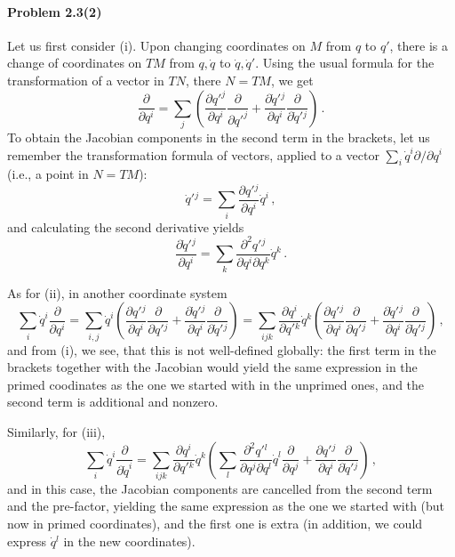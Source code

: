 \documentclass[a4paper,12pt]{article}
\newcommand{\problem}[1]{\paragraph{Problem #1}}
\begin{document}
\problem{2.3(2)} Let us first consider (i). Upon changing coordinates on $M$ from $q$ to $q'$, there is a change of coordinates on $TM$ from $q, \dot{q}$ to $\dot{q}, {\dot q}'$. Using the usual formula for the transformation of a vector in $TN$, there $N=TM$, we get
\[
\frac{\partial}{\partial q^i} = \sum_j \left( \frac{\partial {q'}^j}{\partial q^i}\frac{\partial}{\partial {q'}^j} + \frac{\partial \dot{q}{}'{}^j}{\partial q^i}\frac{\partial}{\partial \dot{q}{}'{}^j}\right)\,.
\]
To obtain the Jacobian components in the second term in the brackets, let us remember the transformation formula of vectors, applied to a vector $\sum_i {\dot q}^i \partial/\partial q^i$ (i.e., a point in $N=TM$):
\[
\dot{q}{}'{}^j = \sum_i \frac{\partial q'{}^j}{\partial q^i} \dot{q}{}^i\,,
\]
and calculating the second derivative yields
\[
\frac{\partial \dot{q}{}'{}^j}{\partial q^i} = \sum_k\frac{\partial^2 q'{}^j}{\partial q^i \partial q^k}\dot{q}{}^k\,.
\]

As for (ii), in another coordinate system
\[
\sum_i {\dot q}^i \frac{\partial}{\partial q^i} = \sum_{i,j} {\dot q}^i \left( \frac{\partial q'{}^j}{\partial q^i} \frac{\partial}{\partial q'{}^j} + \frac{\partial {\dot q}'{}^j}{\partial q^i}\frac{\partial}{\partial \dot{q}{}'{}^j}\right) = \sum_{ijk} \frac{\partial q^i}{\partial q'{}^k} \dot{q}{}^k \left( \frac{\partial q'{}^j}{\partial q^i} \frac{\partial}{\partial q'{}^j} + \frac{\partial {\dot q}'{}^j}{\partial q^i}\frac{\partial}{\partial \dot{q}{}'{}^j}\right)\,,
\]
and from (i), we see, that this is not well-defined globally: the first term in the brackets together with the Jacobian would yield the same expression in the primed coodinates as the one we started with in the unprimed ones, and the second term is additional and nonzero.

Similarly, for (iii),
\[
 \sum_i {\dot q}^i \frac{\partial}{\partial {\dot q}^i} = \sum_{ijk}  \frac{\partial q^i}{\partial q'{}^k} \dot{q}{}^k \left( \sum_l\frac{\partial^2 q'{}^l}{\partial q^j \partial q^l}\dot{q}^l \frac{\partial}{\partial q^j} + \frac{\partial q'{}^j}{\partial q^i}\frac{\partial}{\partial \dot{q}{}'{}^j} \right)\,,
\]
and in this case, the Jacobian components are cancelled from the second term and the pre-factor, yielding the same expression as the one we started with (but now in primed coordinates), and the first one is extra (in addition, we could express $\dot{q}{}^l$ in the new coordinates).

\end{document}
